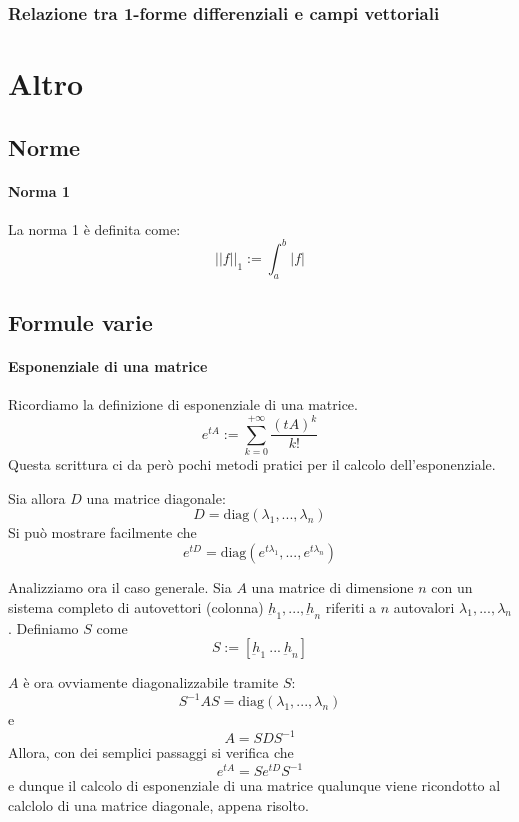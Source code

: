 \documentclass[a4paper,12pt]{article}
\begin{document}
\subsubsection{Relazione tra 1-forme differenziali e campi vettoriali}

\section{Altro}
\subsection{Norme}
\paragraph{Norma 1}
La norma 1 è definita come:
$$||f||_1 := \int_a^b|f|$$
\subsection{Formule varie}
\paragraph{Esponenziale di una matrice}
Ricordiamo la definizione di esponenziale di una matrice.
$$e^{tA} := \sum_{k=0}^{+\infty} \dfrac{(tA)^k}{k!}$$
Questa scrittura ci da però pochi metodi pratici per il calcolo dell'esponenziale.

Sia allora $D$ una matrice diagonale:
$$D=\text{diag}(\lambda_1,...,\lambda_n)$$
Si può mostrare facilmente che
$$e^{tD} = \text{diag}(e^{t\lambda_1}, ..., e^{t\lambda_n})$$

Analizziamo ora il caso generale.
Sia $A$ una matrice di dimensione $n$ con un sistema completo di autovettori (colonna) $\underbar{h}_1, ..., \underbar{h}_n$ riferiti a $n$ autovalori $\lambda_1, ..., \lambda_n$. Definiamo $S$ come
$$S:=[\underbar{h}_1\ ...\ \underbar{h}_n]$$

$A$ è ora ovviamente diagonalizzabile tramite $S$:
$$S^{-1}AS=\text{diag}(\lambda_1,...,\lambda_n)$$
e
$$A = SDS^{-1}$$
Allora, con dei semplici passaggi si verifica che
$$e^{tA} = Se^{tD}S^{-1}$$
e dunque il calcolo di esponenziale di una matrice qualunque viene ricondotto al calclolo di una matrice diagonale, appena risolto.
\end{document}
